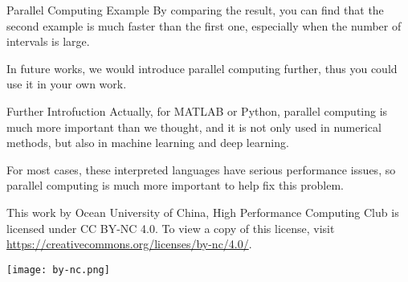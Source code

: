 \documentclass[aspectratio=169]{beamer}
\begin{document}
    \begin{frame}{Parallel Computing Example}
        By comparing the result, you can find that the second example is much faster than the first one, especially when the number of intervals is large.\par
        In future works, we would introduce parallel computing further, thus you could use it in your own work.\par
    \end{frame}

    \begin{frame}{Further Introfuction}
        Actually, for MATLAB or Python, parallel computing is much more important than we thought, and it is not only used in numerical methods, but also in machine learning and deep learning.\par
        For most cases, these interpreted languages have serious performance issues, so parallel computing is much more important to help fix this problem.\par
    \end{frame}
    
    \begin{frame}
        \begin{center}
            This work by Ocean University of China, High Performance Computing Club is licensed under CC BY-NC 4.0. To view a copy of this license, visit \url{https://creativecommons.org/licenses/by-nc/4.0/}.\par
            \texttt{[image: by-nc.png]}
        \end{center}
    \end{frame}
\end{document}
